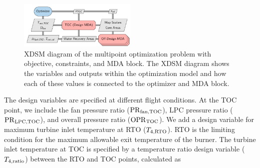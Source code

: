 \documentclass[conf]{new-aiaa}
\begin{document}
\begin{figure}[!hbt]
    \centering
    \includegraphics[width=0.5\textwidth]{N3_opt_XDSM.pdf}
    \caption{
        XDSM diagram of the multipoint optimization problem with objective, constraints, and MDA block.
        The XDSM diagram shows the variables and outputs within the optimization model and how each of these values is connected to the optimizer and MDA block.}
    \label{fig:N3_opt_xdsm}
\end{figure}


The design variables are specified at different flight conditions.
At the TOC point, we include the fan pressure ratio ($\rm{PR}_{\rm{fan,TOC}}$), LPC pressure ratio ($\rm{PR}_{\rm{LPC,TOC}}$), and overall pressure ratio ($\rm{OPR}_{\rm{TOC}}$).
We add a design variable for maximum turbine inlet temperature at RTO ($T_{4,\rm{RTO}}$).
RTO is the limiting condition for the maximum allowable exit temperature of the burner.
The turbine inlet temperature at TOC is specified by a temperature ratio design variable ($T_{4,\rm{ratio}}$) between the RTO and TOC points, calculated as
\end{document}
